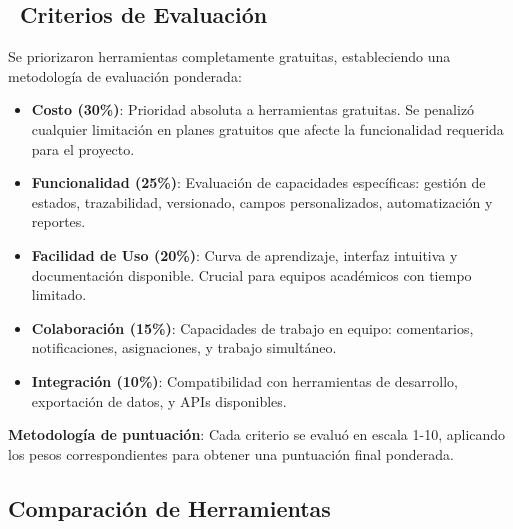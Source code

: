 \documentclass[12pt,a4paper]{article}
\begin{document}
\subsection{\faBalanceScale\ Criterios de Evaluación}

Se priorizaron herramientas completamente gratuitas, estableciendo una metodología de evaluación ponderada:

\begin{tcolorbox}[colback=white, colframe=headercolor, rounded corners, boxrule=1pt]
\begin{itemize}[itemsep=0.4em]
    \item \textcolor{successgreen}{\faDollarSign} \textbf{Costo (30\%)}: Prioridad absoluta a herramientas gratuitas. Se penalizó cualquier limitación en planes gratuitos que afecte la funcionalidad requerida para el proyecto.
    
    \item \textcolor{headercolor}{\faCogs} \textbf{Funcionalidad (25\%)}: Evaluación de capacidades específicas: gestión de estados, trazabilidad, versionado, campos personalizados, automatización y reportes.
    
    \item \textcolor{warningorange}{\faSmile} \textbf{Facilidad de Uso (20\%)}: Curva de aprendizaje, interfaz intuitiva y documentación disponible. Crucial para equipos académicos con tiempo limitado.
    
    \item \textcolor{darkblue}{\faUsers} \textbf{Colaboración (15\%)}: Capacidades de trabajo en equipo: comentarios, notificaciones, asignaciones, y trabajo simultáneo.
    
    \item \textcolor{gray}{\faPlug} \textbf{Integración (10\%)}: Compatibilidad con herramientas de desarrollo, exportación de datos, y APIs disponibles.
\end{itemize}
\end{tcolorbox}

\textbf{Metodología de puntuación}: Cada criterio se evaluó en escala 1-10, aplicando los pesos correspondientes para obtener una puntuación final ponderada.

\subsection{Comparación de Herramientas}
\end{document}
